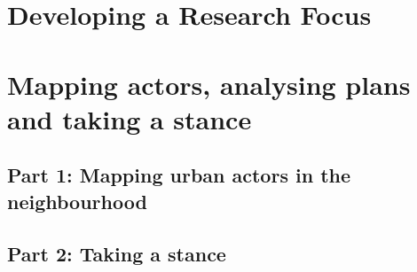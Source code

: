 \documentclass{article}
\begin{document}
\section{Developing a Research Focus}

\section{Mapping actors, analysing plans and taking a stance}

\subsection{Part 1: Mapping urban actors in the neighbourhood}

\subsection{Part 2: Taking a stance}
\end{document}
